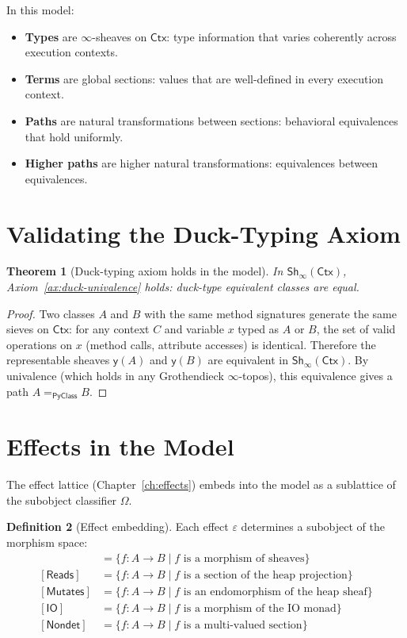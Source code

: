 \documentclass[11pt,a4paper]{report}
\theoremstyle{definition}
\newtheorem{definition}{Definition}[chapter]
\theoremstyle{plain}
\newtheorem{theorem}[definition]{Theorem}
\newcommand{\PyClass}{\mathsf{PyClass}}
\newcommand{\Ctx}{\mathsf{Ctx}}
\newcommand{\Pure}{\mathsf{Pure}}
\newcommand{\Reads}{\mathsf{Reads}}
\newcommand{\Mutates}{\mathsf{Mutates}}
\newcommand{\IO}{\mathsf{IO}}
\newcommand{\Nondet}{\mathsf{Nondet}}
\newcommand{\Sh}{\mathsf{Sh}}
\begin{document}
In this model:
\begin{itemize}
  \item \textbf{Types} are $\infty$-sheaves on $\Ctx$: type information that
    varies coherently across execution contexts.
  \item \textbf{Terms} are global sections: values that are well-defined in every
    execution context.
  \item \textbf{Paths} are natural transformations between sections: behavioral
    equivalences that hold uniformly.
  \item \textbf{Higher paths} are higher natural transformations: equivalences
    between equivalences.
\end{itemize}

\section{Validating the Duck-Typing Axiom}

\begin{theorem}[Duck-typing axiom holds in the model]
\label{thm:duck-model}
In $\Sh_\infty(\Ctx)$, Axiom~\ref{ax:duck-univalence} holds: duck-type equivalent
classes are equal.
\end{theorem}
\begin{proof}
Two classes $A$ and $B$ with the same method signatures generate the same
sieves on $\Ctx$: for any context $C$ and variable $x$ typed as $A$ or $B$,
the set of valid operations on $x$ (method calls, attribute accesses) is
identical. Therefore the representable sheaves $\mathsf{y}(A)$ and $\mathsf{y}(B)$
are equivalent in $\Sh_\infty(\Ctx)$. By univalence (which holds in any
Grothendieck $\infty$-topos), this equivalence gives a path
$A =_{\PyClass} B$.
\end{proof}


\section{Effects in the Model}

The effect lattice (Chapter~\ref{ch:effects}) embeds into the model as a
sublattice of the subobject classifier $\Omega$.

\begin{definition}[Effect embedding]
Each effect $\varepsilon$ determines a subobject of the morphism space:
\begin{align}
  [\Pure] &= \{f : A \to B \mid f \text{ is a morphism of sheaves}\} \\
  [\Reads] &= \{f : A \to B \mid f \text{ is a section of the heap projection}\} \\
  [\Mutates] &= \{f : A \to B \mid f \text{ is an endomorphism of the heap sheaf}\} \\
  [\IO] &= \{f : A \to B \mid f \text{ is a morphism of the IO monad}\} \\
  [\Nondet] &= \{f : A \to B \mid f \text{ is a multi-valued section}\}
\end{align}
\end{definition}
\end{document}
